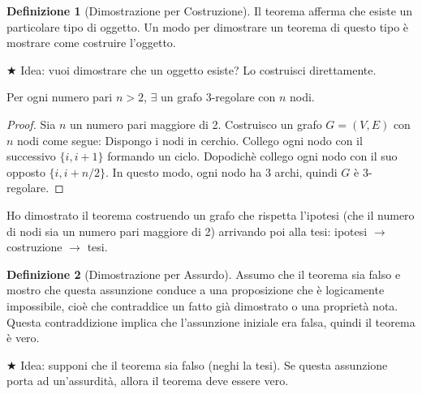 \documentclass{article}  %
\theoremstyle{definition}
\newtheorem{definition}{Definizione}[section]
\begin{document}
\begin{definition}[Dimostrazione per Costruzione]
Il teorema afferma che esiste un particolare tipo di oggetto. Un modo per dimostrare un teorema di questo tipo è mostrare come costruire l’oggetto.
\end{definition}
\(\bigstar\) Idea: vuoi dimostrare che un oggetto esiste? Lo costruisci direttamente.


\begin{esempio}[Esempio]
\footnotesize %
Per ogni numero pari $n>2$, \(\exists\) un grafo $3$-regolare con $n$ nodi.
\begin{proof}
Sia $n$ un numero pari maggiore di 2. Costruisco un grafo \(G=(V,E)\) con $n$ nodi come segue:\newline
Dispongo i nodi in cerchio. Collego ogni nodo con il successivo \(\{i,i+1\}\) formando un ciclo. Dopodichè collego ogni nodo con il suo opposto \(\{i,i+n/2\}\).
In questo modo, ogni nodo ha 3 archi, quindi $G$ è $3$-regolare. 
\end{proof}
Ho dimostrato il teorema costruendo un grafo che rispetta l'ipotesi (che il numero di nodi sia un numero pari maggiore di 2) arrivando poi alla tesi: ipotesi \(\rightarrow\) costruzione \(\rightarrow\) tesi.
\end{esempio}

\begin{definition}[Dimostrazione per Assurdo]
Assumo che il teorema sia falso e mostro che questa assunzione conduce a una proposizione che è logicamente impossibile, cioè che contraddice un fatto già dimostrato o una proprietà nota. Questa contraddizione implica che l’assunzione iniziale era falsa, quindi il teorema è vero.
\end{definition}
\(\bigstar\) Idea: supponi che il teorema sia falso (neghi la tesi). Se questa assunzione porta ad un'assurdità, allora il teorema deve essere vero. 
\end{document}
